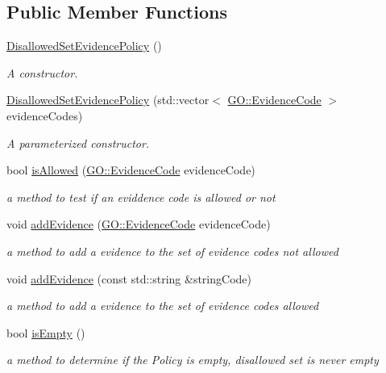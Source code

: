 \subsection*{Public Member Functions}
\begin{DoxyCompactItemize}
\item 
\hyperlink{classDisallowedSetEvidencePolicy_a4db63ff71aa72c7744187a36099e5b09}{Disallowed\+Set\+Evidence\+Policy} ()
\begin{DoxyCompactList}\small\item\em A constructor. \end{DoxyCompactList}\item 
\hyperlink{classDisallowedSetEvidencePolicy_a50c8885e5a3abf0a3110492f07e21268}{Disallowed\+Set\+Evidence\+Policy} (std\+::vector$<$ \hyperlink{namespaceGO_a4ce5387bbcdaec3648957c7903f2caf3}{G\+O\+::\+Evidence\+Code} $>$ evidence\+Codes)
\begin{DoxyCompactList}\small\item\em A parameterized constructor. \end{DoxyCompactList}\item 
bool \hyperlink{classDisallowedSetEvidencePolicy_aaa0959ad33624b4d418d57d286c41852}{is\+Allowed} (\hyperlink{namespaceGO_a4ce5387bbcdaec3648957c7903f2caf3}{G\+O\+::\+Evidence\+Code} evidence\+Code)
\begin{DoxyCompactList}\small\item\em a method to test if an eviddence code is allowed or not \end{DoxyCompactList}\item 
void \hyperlink{classDisallowedSetEvidencePolicy_a565f023aa750687b96206608d17cf392}{add\+Evidence} (\hyperlink{namespaceGO_a4ce5387bbcdaec3648957c7903f2caf3}{G\+O\+::\+Evidence\+Code} evidence\+Code)
\begin{DoxyCompactList}\small\item\em a method to add a evidence to the set of evidence codes not allowed \end{DoxyCompactList}\item 
void \hyperlink{classDisallowedSetEvidencePolicy_ab3ccdee816e866886e77aaf1c5129ae8}{add\+Evidence} (const std\+::string \&string\+Code)
\begin{DoxyCompactList}\small\item\em a method to add a evidence to the set of evidence codes allowed \end{DoxyCompactList}\item 
bool \hyperlink{classDisallowedSetEvidencePolicy_ac913c46a483b9c163099ce5b2128b881}{is\+Empty} ()
\begin{DoxyCompactList}\small\item\em a method to determine if the Policy is empty, disallowed set is never empty \end{DoxyCompactList}\end{DoxyCompactItemize}


